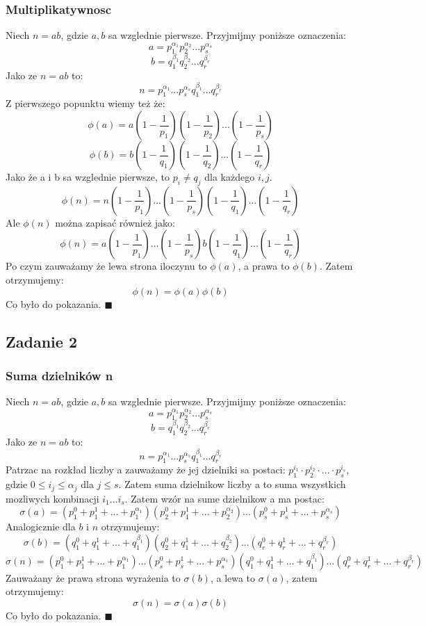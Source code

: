 \subsubsection{Multiplikatywnosc}
Niech $n=ab$, gdzie $a, b$ sa wzglednie pierwsze. Przyjmijmy poniższe oznaczenia:
$$a=p_1^{\alpha_1}p_2^{\alpha_2}...p_s^{\alpha_s}$$
$$b=q_1^{\beta_1}q_2^{\beta_2}...q_r^{\beta_r}$$
Jako ze $n=ab$ to:
$$n=p_1^{\alpha_1}...p_s^{\alpha_s}q_1^{\beta_1}...q_r^{\beta_r}$$
Z pierwszego popunktu wiemy też że:
$$\phi(a) = a (1- \frac{1}{p_1})(1 - \frac{1}{p_2})...(1 - \frac{1}{p_s})$$
$$\phi(b) = b (1- \frac{1}{q_1})(1 - \frac{1}{q_2})...(1 - \frac{1}{q_r})$$
Jako że a i b sa wzglednie pierwsze, to $p_i \neq q_j$ dla każdego $i, j$.
$$\phi(n) = n (1- \frac{1}{p_1})...(1 - \frac{1}{p_s})(1 - \frac{1}{q_1})...(1 - \frac{1}{q_r})$$
Ale $\phi(n)$ można zapisać również jako:
$$\phi(n) = a(1- \frac{1}{p_1})...(1 - \frac{1}{p_s}) b(1 - \frac{1}{q_1})...(1 - \frac{1}{q_r})$$
Po czym zauważamy że lewa strona iloczynu to $\phi(a)$, a prawa to $\phi(b)$.
Zatem otrzymujemy:
$$\phi(n) = \phi(a)\phi(b) $$
Co było do pokazania. $\blacksquare$

\subsection{Zadanie 2}
\subsubsection{Suma dzielników n}
Niech $n=ab$, gdzie $a, b$ sa wzglednie pierwsze. Przyjmijmy poniższe oznaczenia:
$$a=p_1^{\alpha_1}p_2^{\alpha_2}...p_s^{\alpha_s}$$
$$b=q_1^{\beta_1}q_2^{\beta_2}...q_r^{\beta_r}$$
Jako ze $n=ab$ to:
$$n=p_1^{\alpha_1}...p_s^{\alpha_s}q_1^{\beta_1}...q_r^{\beta_r}$$
Patrzac na rozkład liczby a zauważamy że jej dzielniki sa postaci: $p_1^{i_1} \cdot p_2^{i_2} \cdot ... \cdot p_s^{i_s}$, gdzie $ 0\leq i_j \leq\alpha_j$ dla $j\leq s$. Zatem suma dzielnikow liczby a to suma wszystkich mozliwych kombinacji $i_1 ... i_s$. Zatem wzór na sume dzielnikow a ma postac:
$$\sigma (a) = ( p_1^0+p_1^1 + ...+p_1^{\alpha_1}) ( p_2^0+p_1^1 + ...+p_2^{\alpha_2})... ( p_s^0+p_s^1 + ...+p_s^{\alpha_s})$$
Analogicznie dla $b$ i $n$ otrzymujemy:
$$\sigma (b) = ( q_1^0+q_1^1 + ...+q_1^{\beta_1}) ( q_2^0+q_1^1 + ...+q_2^{\beta_2})... ( q_r^0+q_r^1 + ...+q_r^{\beta_r})$$
$$\sigma (n) = ( p_1^0+p_1^1 + ...+p_1^{\alpha_1})... ( p_s^0+p_s^1 + ...+p_s^{\alpha_s})( q_1^0+q_1^1 + ...+q_1^{\beta_1}) ... ( q_r^0+q_r^1 + ...+q_r^{\beta_r})$$
Zauważany że prawa strona wyrażenia to $\sigma(b)$, a lewa to $\sigma(a)$, zatem otrzymujemy:
$$\sigma(n) = \sigma(a)\sigma(b) $$
Co było do pokazania. $\blacksquare$
